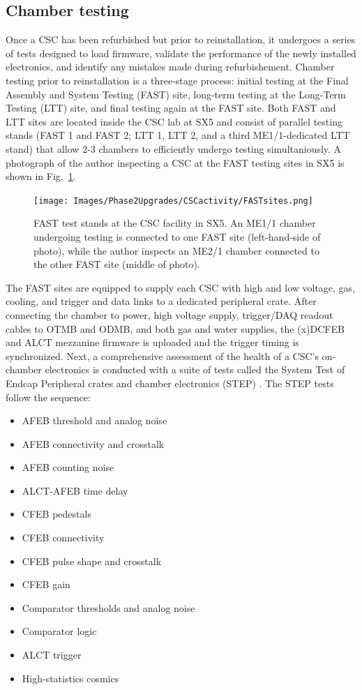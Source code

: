 \subsection{Chamber testing} \label{sec:ChamberTesting}

Once a CSC has been refurbished but prior to reinstallation, it undergoes a series of tests designed to load firmware, validate the performance of the newly installed electronics, and identify any mistakes made during refurbishement. Chamber testing prior to reinstallation is a three-stage process: initial testing at the Final Assembly and System Testing (FAST) site, long-term testing at the Long-Term Testing (LTT) site, and final testing again at the FAST site. Both FAST and LTT sites are located inside the CSC lab at SX5 and consist of parallel testing stands (FAST 1 and FAST 2; LTT 1, LTT 2, and a third ME1/1-dedicated LTT stand) that allow 2-3 chambers to efficiently undergo testing simultaniously. A photograph of the author inspecting a CSC at the FAST testing sites in SX5 is shown in Fig.~\ref{fig:FAST}.

\begin{figure}[H]
    \centering
    {\texttt{[image: Images/Phase2Upgrades/CSCactivity/FASTsites.png]}}
    \caption{FAST test stands at the CSC facility in SX5. An ME1/1 chamber undergoing testing is connected to one FAST site (left-hand-side of photo), while the author inspects an ME2/1 chamber connected to the other FAST site (middle of photo).}
    \label{fig:FAST}
\end{figure}

The FAST sites are equipped to supply each CSC with high and low voltage, gas, cooling, and trigger and data links to a dedicated peripheral crate. After connecting the chamber to power, high voltage supply, trigger/DAQ readout cables to OTMB and ODMB, and both gas and water supplies, the (x)DCFEB and ALCT mezzanine firmware is uploaded and the trigger timing is synchronized. Next, a comprehensive assessment of the health of a CSC's on-chamber electronics is conducted with a suite of tests called the System Test of Endcap Peripheral crates and chamber electronics (STEP) . The STEP tests follow the sequence:
\begin{itemize}
    \item AFEB threshold and analog noise
    \item AFEB connectivity and crosstalk
    \item AFEB counting noise
    \item ALCT-AFEB time delay
    \item CFEB pedestals
    \item CFEB connectivity
    \item CFEB pulse shape and crosstalk
    \item CFEB gain
    \item Comparator thresholds and analog noise
    \item Comparator logic
    \item ALCT trigger
    \item High-statistics cosmics
\end{itemize}

